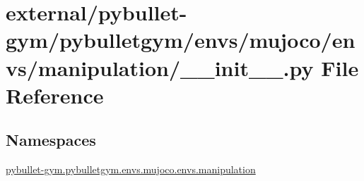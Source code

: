 \hypertarget{external_2pybullet-gym_2pybulletgym_2envs_2mujoco_2envs_2manipulation_2____init_____8py}{}\section{external/pybullet-\/gym/pybulletgym/envs/mujoco/envs/manipulation/\+\_\+\+\_\+init\+\_\+\+\_\+.py File Reference}
\label{external_2pybullet-gym_2pybulletgym_2envs_2mujoco_2envs_2manipulation_2____init_____8py}
\subsection*{Namespaces}
\begin{DoxyCompactItemize}
\item 
 \hyperlink{namespacepybullet-gym_1_1pybulletgym_1_1envs_1_1mujoco_1_1envs_1_1manipulation}{pybullet-\/gym.\+pybulletgym.\+envs.\+mujoco.\+envs.\+manipulation}
\end{DoxyCompactItemize}
